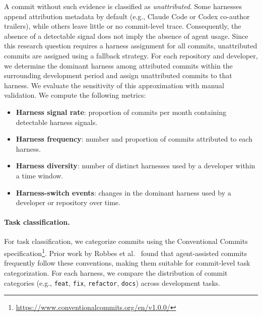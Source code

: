A commit without such evidence is classified as \emph{unattributed}. Some harnesses append attribution metadata by default (e.g., Claude Code or Codex co-author trailers), while others leave little or no commit-level trace. Consequently, the absence of a detectable signal does not imply the absence of agent usage. Since this research question requires a harness assignment for all commits, unattributed commits are assigned using a fallback strategy. For each repository and developer, we determine the dominant harness among attributed commits within the surrounding development period and assign unattributed commits to that harness. We evaluate the sensitivity of this approximation with manual validation. We compute the following metrics:

\begin{itemize}
\item \textbf{Harness signal rate}: proportion of commits per month containing detectable harness signals.
\item \textbf{Harness frequency}: number and proportion of commits attributed to each harness.
\item \textbf{Harness diversity}: number of distinct harnesses used by a developer within a time window.
\item \textbf{Harness-switch events}: changes in the dominant harness used by a developer or repository over time.
\end{itemize}

\paragraph{Task classification.}
For task classification, we categorize commits using the Conventional Commits specification\footnote{\url{https://www.conventionalcommits.org/en/v1.0.0/}}. Prior work by Robbes et al.~\cite{Robbes2026} found that agent-assisted commits frequently follow these conventions, making them suitable for commit-level task categorization. For each harness, we compare the distribution of commit categories (e.g., \texttt{feat}, \texttt{fix}, \texttt{refactor}, \texttt{docs}) across development tasks.


